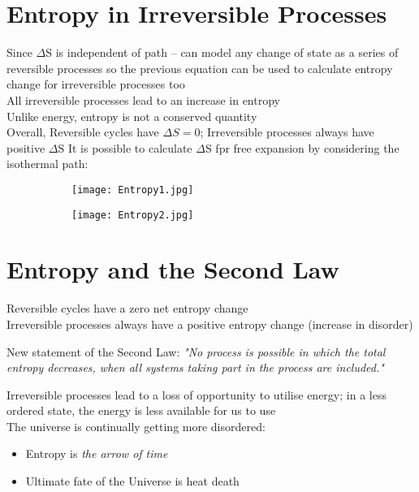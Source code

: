\documentclass[a4paper, 11pt, fleqn, normalem]{report}
\begin{document}
\section*{Entropy in Irreversible Processes}
Since $\Delta$S is independent of path -- can model any change of state as a series of reversible processes so the previous equation can be used to calculate entropy change for irreversible processes too \\
All irreversible processes lead to an increase in entropy \\
Unlike energy, entropy is not a conserved quantity \\
Overall, Reversible cycles have ${\Delta}S = 0$; Irreversible processes always have positive $\Delta$S
It is possible to calculate $\Delta$S fpr free expansion by considering the isothermal path:
\begin{figure}[H]
	\begin{subfigure}{0.4\textwidth}
		\texttt{[image: Entropy1.jpg]}
	\end{subfigure}
	\begin{subfigure}{0.3\textwidth}
		\texttt{[image: Entropy2.jpg]}
	\end{subfigure}
\end{figure}

\section*{Entropy and the Second Law}
Reversible cycles have a zero net entropy change \\
Irreversible processes always have a positive entropy change (increase in disorder)

New statement of the Second Law: \emph{"No process is possible in which the total entropy decreases, when all systems taking part in the process are included."}

Irreversible processes lead to a loss of opportunity to utilise energy; in a less ordered state, the energy is less available for us to use \\
The universe is continually getting more disordered:
\vspace{-8pt}
\begin{itemize}
	\item Entropy is \emph{the arrow of time}
	\item Ultimate fate of the Universe is heat death
\end{itemize}
\end{document}
